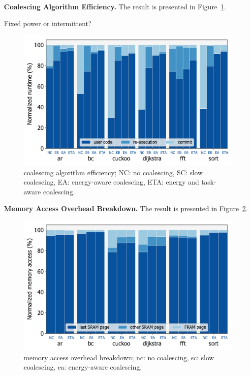\textbf{\sys Coalescing Algorithm Efficiency.} The result is presented in Figure~\ref{fig:coalEfficiency}.

Fixed power or intermittent?

\begin{figure}
	\centering
	\includegraphics[width=\columnwidth]{figures/coalEfficiency}
	\caption{\sys coalescing algorithm efficiency; NC: no coalescing, SC: slow coalescing, EA: energy-aware coalescing, ETA: energy and task-aware coalescing. }
	\label{fig:coalEfficiency}
\end{figure}

\textbf{\sys Memory Access Overhead Breakdown.} The result is presented in Figure~\ref{fig:coalmemory}.

\begin{figure}
	\centering
	\includegraphics[width=\columnwidth]{figures/memAccess}
	\caption{\sys memory access overhead breakdown; nc: no coalescing, sc: slow coalescing, ea: energy-aware coalescing. }
	\label{fig:coalmemory}
\end{figure}

